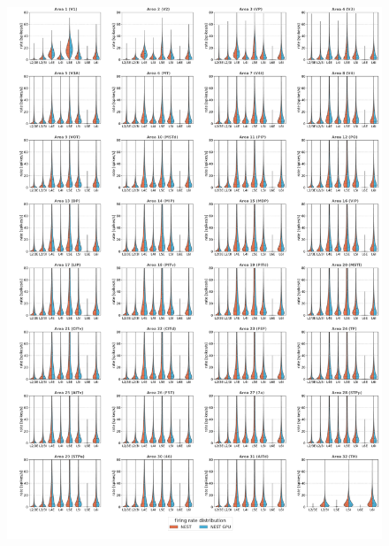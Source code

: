 \documentclass[a4paper, 12pt, twoside, openright]{book}
\begin{document}
\begin{figure}[H]
    \centering
    \includegraphics[width=\columnwidth]{figures/dist_violinplot_vert_ms_firing_rate.pdf}
\end{figure}
\end{document}
